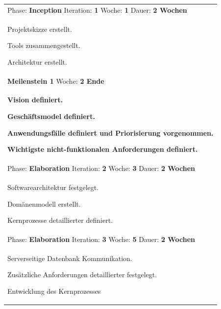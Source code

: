 \documentclass[11pt,ngerman]{article}
\begin{document}
    \begin{tabularx}{\textwidth}{X}
    	\toprule
    	Phase: \textbf{Inception} Iteration: \textbf{1} Woche: \textbf{1} Dauer: \textbf{2 Wochen}\\
    	\begin{compactitem}
    		\item Projektskizze erstellt.
    		\item Tools zusammengestellt.
    		\item Architektur erstellt.
    	\end{compactitem}\\
    	\toprule
    	\rowcolor{lightgray}
    	\textbf{Meilenstein 1} Woche: \textbf{2 Ende}\\
    	\rowcolor{lightgray}
    	\begin{compactitem}
    		\item \textbf{Vision definiert.}
    		\item \textbf{Geschäftsmodel definiert.}
    		\item \textbf{Anwendungsfälle definiert und Priorisierung vorgenommen.}
    		\item \textbf{Wichtigste nicht-funktionalen Anforderungen definiert.}
    	\end{compactitem}\\
    	\toprule
    	Phase: \textbf{Elaboration} Iteration: \textbf{2} Woche: \textbf{3} Dauer: \textbf{2 Wochen}\\
    	\begin{compactitem}
    		\item Softwarearchitektur festgelegt.
    		\item Domänenmodell erstellt.
    		\item Kernprozesse detaillierter definiert.
    	\end{compactitem}\\
    	\toprule
    	Phase: \textbf{Elaboration} Iteration: \textbf{3} Woche: \textbf{5} Dauer: \textbf{2 Wochen}\\
    	\begin{compactitem}
    		\item Serverseitige Datenbank Kommunikation.
    		\item Zusätzliche Anforderungen detaillierter festgelegt.
    		\item Entwicklung des Kernprozesses


\end{compactitem}
\end{tabularx}
\end{document}
